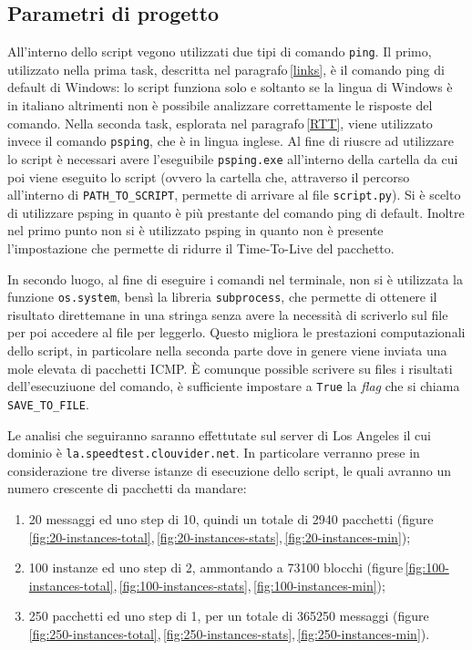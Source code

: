 \vspace{10px}\subsection{Parametri di progetto}

All'interno dello script vegono utilizzati due tipi di comando \texttt{ping}. Il primo, utilizzato nella prima task, descritta nel paragrafo\,\ref{links}, è il comando ping di default di Windows: lo script funziona solo e soltanto se la lingua di Windows è in italiano altrimenti non è possibile analizzare correttamente le risposte del comando. Nella seconda task, esplorata nel paragrafo\,\ref{RTT}, viene utilizzato invece il comando \texttt{psping}, che è in lingua inglese. Al fine di riuscre ad utilizzare lo script è necessari avere l'eseguibile \texttt{psping.exe} all'interno della cartella da cui poi viene eseguito lo script (ovvero la cartella che, attraverso il percorso all'interno di \texttt{PATH\_TO\_SCRIPT}, permette di arrivare al file \texttt{script.py}). Si è scelto di utilizzare psping in quanto è più prestante del comando ping di default. Inoltre nel primo punto non si è utilizzato psping in quanto non è presente l'impostazione che permette di ridurre il Time-To-Live del pacchetto.

In secondo luogo, al fine di eseguire i comandi nel terminale, non si è utilizzata la funzione \texttt{os.system}, bensì la libreria \texttt{subprocess}, 
che permette di ottenere il risultato direttemane in una stringa senza avere la necessità di scriverlo sul file per poi accedere al file per leggerlo. Questo migliora le prestazioni computazionali dello script, in particolare nella seconda parte dove in genere viene inviata una mole elevata di pacchetti ICMP. È comunque possible scrivere su files i risultati dell'esecuziuone del comando, è sufficiente impostare a \texttt{True} la \textsl{flag} che si chiama \texttt{SAVE\_TO\_FILE}.

Le analisi che seguiranno saranno effettutate sul server di Los Angeles il cui dominio è \texttt{la.speedtest.clouvider.net}. In particolare verranno prese in considerazione tre diverse istanze di esecuzione dello script, le quali avranno un numero crescente di pacchetti da mandare:

\begin{enumerate}
    \setlength{\itemsep}{4px}
    \item 20 messaggi ed uno step di 10, quindi un totale di 2940 pacchetti (figure\,\ref{fig:20-instances-total},\,\ref{fig:20-instances-stats},\,\ref{fig:20-instances-min});
    \item 100 instanze ed uno step di 2, ammontando a 73100 blocchi (figure\,\ref{fig:100-instances-total},\,\ref{fig:100-instances-stats},\,\ref{fig:100-instances-min});
    \item 250 pacchetti ed uno step di 1, per un totale di 365250 messaggi (figure\,\ref{fig:250-instances-total},\,\ref{fig:250-instances-stats},\,\ref{fig:250-instances-min}).
\end{enumerate}




